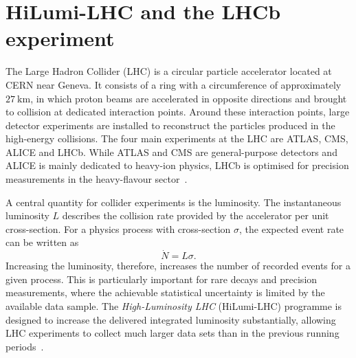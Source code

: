 \chapter{HiLumi-LHC and the LHCb experiment}
The Large Hadron Collider (LHC) is a circular particle accelerator located at CERN near Geneva. It consists of a ring with a circumference of approximately $\SI{27}{\kilo\meter}$, in which proton beams are accelerated in opposite directions and brought to collision at dedicated interaction points. Around these interaction points, large detector experiments are installed to reconstruct the particles produced in the high-energy collisions. The four main experiments at the LHC are ATLAS, CMS, ALICE and LHCb. While ATLAS and CMS are general-purpose detectors and ALICE is mainly dedicated to heavy-ion physics, LHCb is optimised for precision measurements in the heavy-flavour sector~\cite{Schmitz2026-je}.\par
A central quantity for collider experiments is the luminosity. The instantaneous luminosity $L$ describes the collision rate provided by the accelerator per unit cross-section. For a physics process with cross-section $\sigma$, the expected event rate can be written as 
\begin{equation}
    \dot{N} = L\sigma.
\end{equation}
Increasing the luminosity, therefore, increases the number of recorded events for a given process. This is particularly important for rare decays and precision measurements, where the achievable statistical uncertainty is limited by the available data sample. The \textit{High-Luminosity LHC} (HiLumi-LHC) programme is designed to increase the delivered integrated luminosity substantially, allowing LHC experiments to collect much larger data sets than in the previous running periods~\cite{Jashal:2919560}.
%
%
